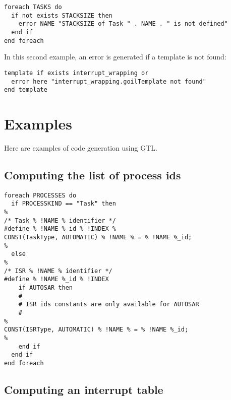\begin{lstlisting}
foreach TASKS do
  if not exists STACKSIZE then
    error NAME "STACKSIZE of Task " . NAME . " is not defined"
  end if
end foreach
\end{lstlisting}

In this second example, an error is generated if a template is not found:

\begin{lstlisting}
template if exists interrupt_wrapping or
  error here "interrupt_wrapping.goilTemplate not found"
end template
\end{lstlisting}

\section{Examples}

Here are examples of code generation using GTL.

\subsection{Computing the list of process ids}

\begin{lstlisting}
foreach PROCESSES do
  if PROCESSKIND == "Task" then
%
/* Task % !NAME % identifier */
#define % !NAME %_id % !INDEX %
CONST(TaskType, AUTOMATIC) % !NAME % = % !NAME %_id;
%
  else
%
/* ISR % !NAME % identifier */
#define % !NAME %_id % !INDEX 
    if AUTOSAR then
    #
    # ISR ids constants are only available for AUTOSAR
    #
%
CONST(ISRType, AUTOMATIC) % !NAME % = % !NAME %_id;
%
    end if
  end if
end foreach
\end{lstlisting}

\subsection{Computing an interrupt table}

